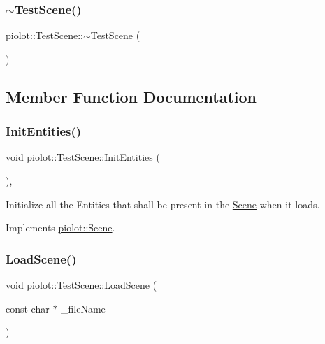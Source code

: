 \subsubsection{\texorpdfstring{$\sim$\+Test\+Scene()}{~TestScene()}}
{\footnotesize\ttfamily piolot\+::\+Test\+Scene\+::$\sim$\+Test\+Scene (\begin{DoxyParamCaption}{ }\end{DoxyParamCaption})\hspace{0.3cm}{\ttfamily [default]}}



\subsection{Member Function Documentation}
\mbox{\label{classpiolot_1_1_test_scene_a76c03545ecd764cd4350eec338c9a94e}} 
\subsubsection{\texorpdfstring{Init\+Entities()}{InitEntities()}}
{\footnotesize\ttfamily void piolot\+::\+Test\+Scene\+::\+Init\+Entities (\begin{DoxyParamCaption}{ }\end{DoxyParamCaption})\hspace{0.3cm}{\ttfamily [override]}, {\ttfamily [virtual]}}



Initialize all the Entities that shall be present in the \mbox{\hyperlink{classpiolot_1_1_scene}{Scene}} when it loads. 



Implements \mbox{\hyperlink{group___virtual_ga6871dbb3f61a724a166fd83c3c1dc3a3}{piolot\+::\+Scene}}.

\mbox{\label{classpiolot_1_1_test_scene_a513072b5c63768aa0fcd0dd5a0a0ca98}} 
\subsubsection{\texorpdfstring{Load\+Scene()}{LoadScene()}}
{\footnotesize\ttfamily void piolot\+::\+Test\+Scene\+::\+Load\+Scene (\begin{DoxyParamCaption}\item[{const char $\ast$}]{\+\_\+file\+Name }\end{DoxyParamCaption})}



